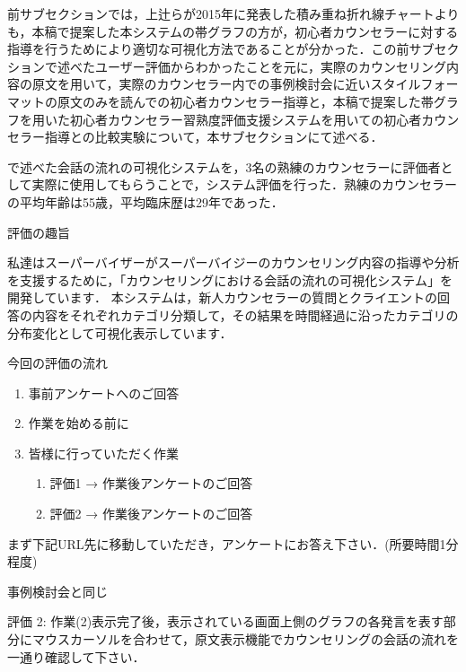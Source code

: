\documentclass[shuuron]{kuee}
\begin{document}



前サブセクションでは，上辻らが2015年に発表した積み重ね折れ線チャートよりも，本稿で提案した本システムの帯グラフの方が，初心者カウンセラーに対する指導を行うためにより適切な可視化方法であることが分かった．この前サブセクションで述べたユーザー評価からわかったことを元に，実際のカウンセリング内容の原文を用いて，実際のカウンセラー内での事例検討会に近いスタイルフォーマットの原文のみを読んでの初心者カウンセラー指導と，本稿で提案した帯グラフを用いた初心者カウンセラー習熟度評価支援システムを用いての初心者カウンセラー指導との比較実験について，本サブセクションにて述べる．

で述べた会話の流れの可視化システムを，3名の熟練のカウンセラーに評価者として実際に使用してもらうことで，システム評価を行った．熟練のカウンセラーの平均年齢は55歳，平均臨床歴は29年であった．

評価の趣旨

私達はスーパーバイザーがスーパーバイジーのカウンセリング内容の指導や分析を支援するために，「カウンセリングにおける会話の流れの可視化システム」を開発しています．
本システムは，新人カウンセラーの質問とクライエントの回答の内容をそれぞれカテゴリ分類して，その結果を時間経過に沿ったカテゴリの分布変化として可視化表示しています．

今回の評価の流れ







\begin{enumerate}

 \item 事前アンケートへのご回答
  \item 作業を始める前に
   \item 皆様に行っていただく作業
   \begin{enumerate}
   \item 評価1 → 作業後アンケートのご回答
    \item 評価2 → 作業後アンケートのご回答
    \end{enumerate}
\end{enumerate}


まず下記URL先に移動していただき，アンケートにお答え下さい．(所要時間1分程度)


事例検討会と同じ

評価 2: 作業(2)表示完了後，表示されている画面上側のグラフの各発言を表す部分にマウスカーソルを合わせて，原文表示機能でカウンセリングの会話の流れを一通り確認して下さい．
\end{document}
